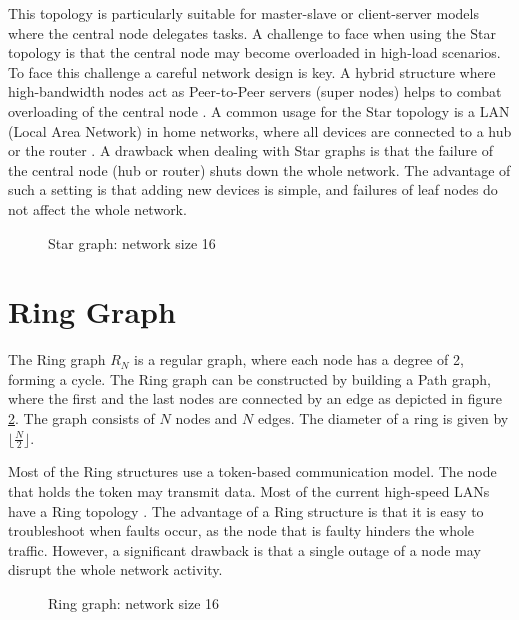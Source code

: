 This topology is particularly suitable for master-slave or client-server models where the central node delegates tasks. A challenge to face when using the Star topology is that the central node may become overloaded in high-load scenarios. To face this challenge a careful network design is key. A hybrid structure where high-bandwidth nodes act as Peer-to-Peer servers (super nodes) helps to combat overloading of the central node \cite{Peer2PeerSchindelhaauer2023}. A common usage for the Star topology is a LAN (Local Area Network) in home networks, where all devices are connected to a hub or the router \cite{Jayeola2023}. A drawback when dealing with Star graphs is that the failure of the central node (hub or router) shuts down the whole network. The advantage of such a setting is that adding new devices is simple, and failures of leaf nodes do not affect the whole network.

\begin{figure}[H]
    \centering
    
    \caption{Star graph: network size 16}
    \label{fig:stargraphDemo}
\end{figure}

\section{Ring Graph}\label{sec:2ringgraph}
The Ring graph $R_N$ is a regular graph, where each node has a degree of 2, forming a cycle. The Ring graph can be constructed by building a Path graph, where the first and the last nodes are connected by an edge as depicted in figure \ref{fig:ring}. The graph consists of $N$ nodes and $N$ edges. The diameter of a ring is given by $\lfloor{\frac{N}{2}}\rfloor$.

Most of the Ring structures use a token-based communication model. The node that holds the token may transmit data. Most of the current high-speed LANs have a Ring topology \cite{Vidomenko1997}. The advantage of a Ring structure is that it is easy to troubleshoot when faults occur, as the node that is faulty hinders the whole traffic. However, a significant drawback is that a single outage of a node may disrupt the whole network activity.

\begin{figure}[H]
    \centering
    \scalebox{0.8}{}
    \caption{Ring graph: network size 16}
    \label{fig:ring}
\end{figure}


